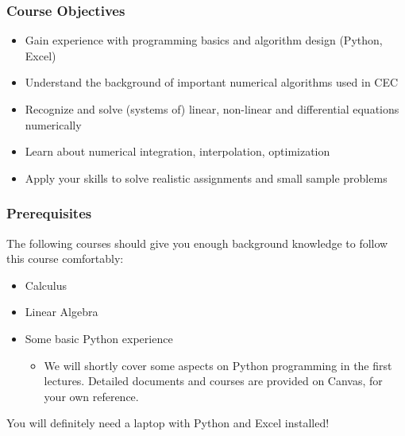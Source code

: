 \begin{frame}
 \frametitle{Course Objectives}
 \begin{itemize}
  \item Gain experience with programming basics and algorithm design (Python, Excel)
  \item Understand the background of important numerical algorithms used in CEC 
  \item Recognize and solve (systems of) linear, non-linear and differential equations numerically
  \item Learn about numerical integration, interpolation, optimization
  \item Apply your skills to solve realistic assignments and small sample problems
 \end{itemize}
\end{frame}

\begin{frame}
 \frametitle{Prerequisites}
  The following courses should give you enough background knowledge to follow this course comfortably:
 \begin{itemize}
   \item Calculus
   \item Linear Algebra
   \item Some basic Python experience
     \begin{itemize}
      \item We will shortly cover some aspects on Python programming in the first lectures. Detailed documents and courses are provided on Canvas, for your own reference.     
    \end{itemize}
  \end{itemize}
  You will definitely need a laptop with Python and Excel installed!
\end{frame}


